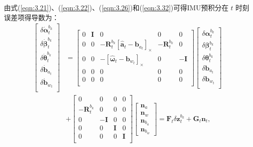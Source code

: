 由式(\ref{eqn:3.21})、(\ref{eqn:3.22})、(\ref{eqn:3.26})和(\ref{eqn:3.32})可得IMU预积分在 $t$ 时刻误差项得导数为：
\begin{equation}
\label{eqn:3.33}
\begin{split}
\begin{bmatrix}
\delta\dot{\bm{\alpha}}_t^{b_k} \\
\delta\dot{\bm{\beta }}_t^{b_k} \\
\delta\dot{\bm{\theta}}_t^{b_k} \\
\delta\dot{\mathbf{b}}_{a_t} \\
\delta\dot{\mathbf{b}}_{w_t} \\
\end{bmatrix} &= 
\begin{bmatrix}
0 & \mathbf{I} & 0 & 0 & 0 \\
0 & 0 & -\mathbf{R}_t^{b_k}\left[{\hat{\mathbf{a}}_t-\mathbf{b}_{a_t}}\right]_\times & -\mathbf{R}_t^{b_k} & 0 \\
0 & 0 & -\left[{\hat{\bm{\omega}}_t-\mathbf{b}_{w_t}}\right]_\times & 0 & -\mathbf{I} \\
0 & 0 & 0 & 0 & 0 \\
0 & 0 & 0 & 0 & 0 \\
\end{bmatrix}
\begin{bmatrix}
\delta\bm{\alpha}_t^{b_k} \\
\delta\bm{\beta }_t^{b_k} \\
\delta\bm{\theta}_t^{b_k} \\
\delta\mathbf{b}_{a_t} \\
\delta\mathbf{b}_{w_t} \\
\end{bmatrix} \\
&+\begin{bmatrix}
0 & 0 & 0 & 0 \\
-\mathbf{R}_t^{b_k} & 0 & 0 & 0 \\
0 & -\mathbf{I} & 0 & 0  \\
0 & 0 & \mathbf{I} & 0 \\
0 & 0 & 0 & \mathbf{I} \\
\end{bmatrix}
\begin{bmatrix}
\mathbf{n}_a \\ \mathbf{n}_w \\ 
\mathbf{n}_{b_a} \\ \mathbf{n}_{b_w}
\end{bmatrix} = \mathbf{F}_t \delta \mathbf{z}_t^{b_k}
+\mathbf{G}_t\mathbf{n}_t,
\end{split}
\end{equation}

